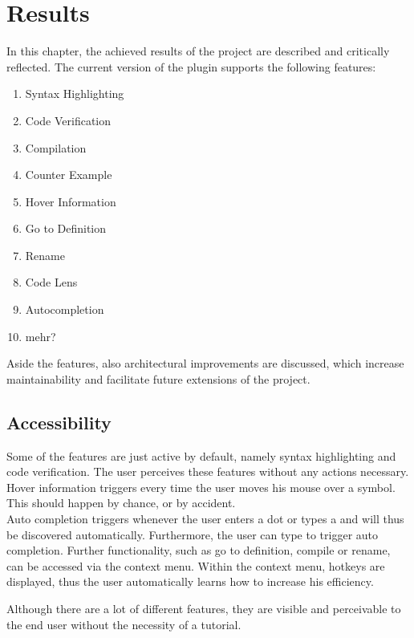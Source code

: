\section{Results}
\label{section:results}
In this chapter, the achieved results of the project are described and critically reflected.
The current version of the plugin supports the following features:
\begin{enumerate}
    \item Syntax Highlighting
    \item Code Verification
    \item Compilation
    \item Counter Example
    \item Hover Information
    \item Go to Definition
    \item Rename
    \item Code Lens
    \item Autocompletion
    \item mehr?
\end{enumerate}


Aside the features, also architectural improvements are discussed,
which increase maintainability and facilitate future extensions of the project.

\subsection{Accessibility}
Some of the features are just active by default, namely syntax highlighting and code verification.
The user perceives these features without any actions necessary.\\

Hover information triggers every time the user moves his mouse over a symbol.
This should happen by chance, or by accident.\\

Auto completion triggers whenever the user enters a dot or types a  and will thus be discovered automatically. 
Furthermore, the user can type  to trigger auto completion.
Further functionality, such as go to definition, compile or rename, can be accessed via the context menu.
Within the context menu, hotkeys are displayed, thus the user automatically learns how to increase his efficiency.

Although there are a lot of different features, they are visible and perceivable to the end user without the necessity of a tutorial.

